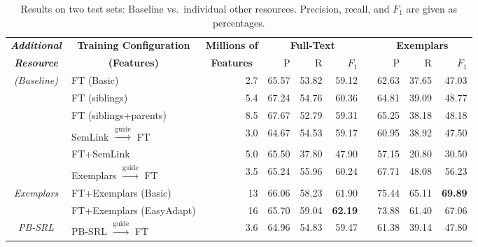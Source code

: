 \begin{table*}\centering\small
\begin{tabular}{>{\itshape}clr<{\hspace*{15pt}}rrr@{~~}r@{~~}rrr}
\toprule
\normalfont\textbf{Additional} & \multicolumn{1}{c}{\textbf{Training Configuration}} & \multicolumn{1}{c}{\textbf{Millions of}} & \multicolumn{3}{c}{\textbf{Full-Text}} && \multicolumn{3}{c}{\textbf{Exemplars}} \\
\cline{4-6}\cline{8-10}
\normalfont\textbf{Resource} &  \multicolumn{1}{c}{\textbf{(Features)}} & \multicolumn{1}{c}{\textbf{Features}} & P\hphantom{11} & R\hphantom{11} & $F_1$\hphantom{0} && P\hphantom{11} & R\hphantom{11} & $F_1$\hphantom{0} \\
\midrule
(Baseline) & FT (Basic) & 2.7 & 65.57 & 53.82 & 59.12 && 62.63 & 37.65 & 47.03 \\
\midrule
\multirow{2}{*}{FN Hierarchy} & FT (siblings) & 5.4 & 67.24 & 54.76 & 60.36 && 64.81 & 39.09 & 48.77 \\
          & FT (siblings+parents) & 8.5 & 67.67 & 52.79 & 59.31 && 65.25 & 38.18 & 48.18 \\
\midrule
\multirow{2}{*}{SemLink} & SemLink $\xrightarrow{\text{guide}}$ FT & 3.0 & 64.67 & 54.53 & 59.17 && 60.95 & 38.92 & 47.50 \\
& FT+SemLink & 5.0 & 65.50 & 37.80 & 47.90 && 57.15 & 20.80 & 30.50 \\
\midrule
& Exemplars $\xrightarrow{\text{guide}}$ FT & 3.5 & 65.24 & 55.96 & 60.24 && 67.71 & 48.08 & 56.23\\
Exemplars & FT+Exemplars (Basic) & 13\nss{.?} & 66.06 & 58.23 & 61.90 && 75.44 & 65.11 & \bf{69.89} \\
& FT+Exemplars (EasyAdapt) & 16\nss{.?} & 65.70 & 59.04 & \bf{62.19} && 73.88 & 61.40 & 67.06 \\
\midrule
PB-SRL & PB-SRL $\xrightarrow{\text{guide}}$ FT & 3.6 & 64.96 & 54.83 & 59.47 && 61.38 & 39.14 & 47.80 \\
\bottomrule
\end{tabular}
\caption{Results on two test sets: Baseline vs.~individual other resources. 
Precision, recall, and $F_1$ are given as percentages.}
\label{tbl:results}
\end{table*}

